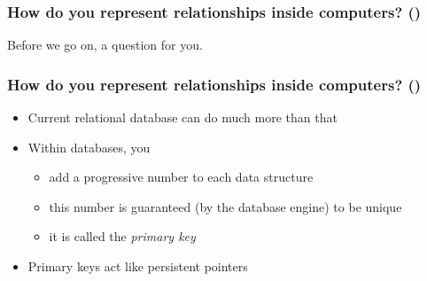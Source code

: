 \documentclass[\printmode,compress,xcolor=dvipsnames]{beamer}
\begin{document}
\begin{frame}
  \frametitle<+->{How do you represent relationships inside computers?  ()}

  \alert{Before we go on, a question for you.}


\end{frame}

\begin{frame}
  \frametitle<+->{How do you represent relationships inside computers?  ()}

  \begin{itemize}[<+- | alert@+->]

    \item Current relational database can do much more than that

    \item Within databases, you

    \begin{itemize}[<+- | alert@+->]

      \item add a progressive number to each data structure

      \item this number is guaranteed (by the database engine) to be unique

      \item it is called the \emph{primary key}

    \end{itemize}

    \item Primary keys act like persistent pointers

  \end{itemize}

\end{frame}
\end{document}
